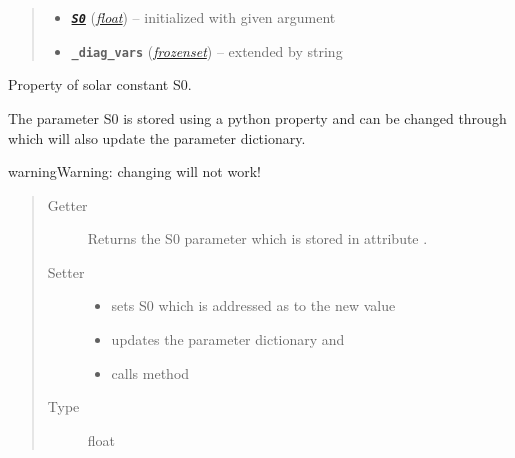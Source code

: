 \documentclass[letterpaper,10pt,english]{sphinxmanual}
\begin{document}
\begin{fulllineitems}
\begin{quote}
\begin{description}
\begin{itemize}
\item {} 
{\hyperref[api/climlab.radiation:climlab.radiation.insolation._Insolation.S0]{\emph{\textbf{\texttt{S0}}}}} (\href{http://docs.python.org/2.7/library/functions.html\#float}{\emph{float}}) -- initialized with given argument 

\item {} 
\textbf{\texttt{\_diag\_vars}} (\href{http://docs.python.org/2.7/library/stdtypes.html\#frozenset}{\emph{frozenset}}) -- extended by string 

\end{itemize}

\end{description}\end{quote}

\begin{fulllineitems}
\label{api/climlab.radiation:climlab.radiation.insolation._Insolation.S0}
Property of solar constant S0.

The parameter S0 is stored using a python property and can be changed through 
 which will also update the parameter dictionary.

\begin{notice}{warning}{Warning:}
changing  will not work!
\end{notice}
\begin{quote}\begin{description}
\item[{Getter}] \leavevmode
Returns the S0 parameter which is stored in attribute .

\item[{Setter}] \leavevmode\begin{itemize}
\item {} 
sets S0 which is addressed as  to the new value

\item {} 
updates the parameter dictionary  and

\item {} 
calls method 

\end{itemize}

\item[{Type}] \leavevmode
float

\end{description}\end{quote}

\end{fulllineitems}


\end{fulllineitems}
\end{document}
